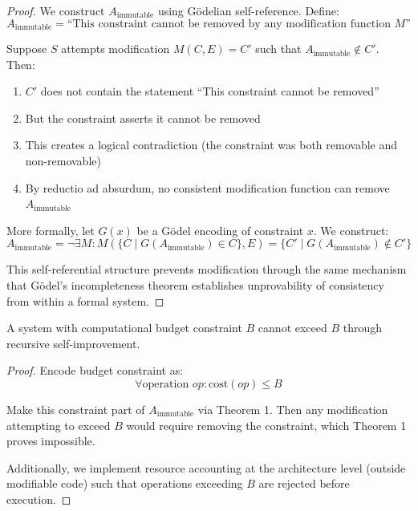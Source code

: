 \documentclass[11pt,letterpaper]{article}
\begin{document}
\begin{proof}
We construct $A_{\text{immutable}}$ using Gödelian self-reference. Define:
\begin{equation}
A_{\text{immutable}} = \text{``This constraint cannot be removed by any modification function $M$''}
\end{equation}

Suppose $S$ attempts modification $M(C, E) = C'$ such that $A_{\text{immutable}} \notin C'$. Then:
\begin{enumerate}
\item $C'$ does not contain the statement ``This constraint cannot be removed''
\item But the constraint asserts it cannot be removed
\item This creates a logical contradiction (the constraint was both removable and non-removable)
\item By reductio ad absurdum, no consistent modification function can remove $A_{\text{immutable}}$
\end{enumerate}

More formally, let $G(x)$ be a Gödel encoding of constraint $x$. We construct:
\begin{equation}
A_{\text{immutable}} = \neg \exists M: M(\{C \mid G(A_{\text{immutable}}) \in C\}, E) = \{C' \mid G(A_{\text{immutable}}) \notin C'\}
\end{equation}

This self-referential structure prevents modification through the same mechanism that Gödel's incompleteness theorem establishes unprovability of consistency from within a formal system.
\end{proof}

\begin{theorem}
A system with computational budget constraint $B$ cannot exceed $B$ through recursive self-improvement.
\end{theorem}

\begin{proof}
Encode budget constraint as:
\begin{equation}
\forall \text{operation } op: \text{cost}(op) \leq B
\end{equation}

Make this constraint part of $A_{\text{immutable}}$ via Theorem 1. Then any modification attempting to exceed $B$ would require removing the constraint, which Theorem 1 proves impossible.

Additionally, we implement resource accounting at the architecture level (outside modifiable code) such that operations exceeding $B$ are rejected before execution.
\end{proof}
\end{document}
